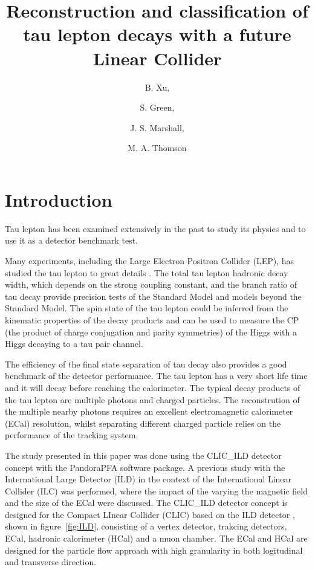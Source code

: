 \documentclass[a4paper,11pt]{article}
\title{\boldmath Reconstruction and classification of tau lepton decays with a future Linear Collider}
\author[a,1]{B. Xu,\note{Corresponding author.}}
\author[a]{S. Green,}
\author[a]{J. S. Marshall,}
\author[a]{M. A. Thomson}
\affiliation[a]{Cavendish Laboratory,\\JJ Thomson Avenue, Cambridge, CB3 0HE, UK}
\begin{document}
\maketitle
\flushbottom


\section{Introduction}

Tau lepton has been examined extensively in the past to study its physics and to use it as a detector benchmark test. 

Many experiments, including the Large Electron Positron Collider (LEP), has studied the tau lepton to great details \cite{Schael:2005am}. The total tau lepton hadronic decay width, which depends on the strong coupling constant, and the branch ratio of tau decay provide precision tests of the Standard Model and models beyond the Standard Model. The spin state of the tau lepton could be inferred from the kinematic properties of the decay products and can be used to measure the CP (the product of charge conjugation and parity symmetries) of the Higgs with a Higgs decaying to a tau pair channel. 

The efficiency of the final state separation of tau decay also provides a good benchmark of the detector performance. The tau lepton has a very short life time and it will decay before reaching the calorimeter. The typical decay products of the tau lepton are multiple photons and charged particles. The reconstrution of the multiple nearby photons requires an excellent electromagnetic calorimeter (ECal) resolution, whilst separating different charged particle relies on the performance of the tracking system. 


The study presented in this paper was done using the CLIC\_ILD detector concept with the PandoraPFA software package. A previous study with the International Large Detector (ILD) in the context of the International Linear Collider (ILC) was performed, where the impact of the varying the magnetic field and the size of the ECal were discussed. The CLIC\_ILD detector concept \cite{Linssen:2012hp} is designed for the Compact LInear Collider (CLIC) based on the ILD detector \cite{Abe:2010aa}, shown in figure~\ref{fig:ILD}, consisting of a vertex detector, trakcing detectors, ECal, hadronic calorimeter (HCal) and a muon chamber. The ECal and HCal are designed for the particle flow approach \cite{Thomson:2009rp} with high granularity in both logitudinal and transverse direction.
\end{document}
